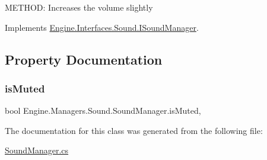 M\+E\+T\+H\+OD\+: Increases the volume slightly 



Implements \hyperlink{a00482_afe3eaaed21c8b64692bc338309ac4a4d}{Engine.\+Interfaces.\+Sound.\+I\+Sound\+Manager}.



\subsection{Property Documentation}
\mbox{\label{a00546_a2a4a319a1d395e58c2b10f393475a0c9}} 
\subsubsection{\texorpdfstring{is\+Muted}{isMuted}}
{\footnotesize\ttfamily bool Engine.\+Managers.\+Sound.\+Sound\+Manager.\+is\+Muted\hspace{0.3cm}{\ttfamily [get]}, {\ttfamily [set]}}



The documentation for this class was generated from the following file\+:\begin{DoxyCompactItemize}
\item 
\hyperlink{a00191}{Sound\+Manager.\+cs}\end{DoxyCompactItemize}
